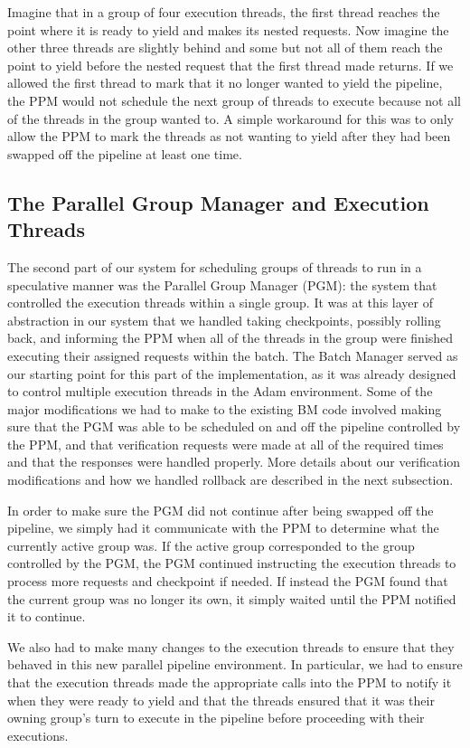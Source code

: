 \documentclass[11pt, oneside]{report}
\begin{document}
Imagine that in a group of four execution threads, the first thread reaches the point where it is ready to yield and makes its nested requests. 
Now imagine the other three threads are slightly behind and some but not all of them reach the point to yield before the nested request that the first thread made returns. 
If we allowed the first thread to mark that it no longer wanted to yield the pipeline, the PPM would not schedule the next group of threads to execute because not all of the threads in the group wanted to. 
A simple workaround for this was to only allow the PPM to mark the threads as not wanting to yield after they had been swapped off the pipeline at least one time.

\subsection{The Parallel Group Manager and Execution Threads}

The second part of our system for scheduling groups of threads to run in a speculative manner was the Parallel Group Manager (PGM): the system that controlled the execution threads within a single group. 
It was at this layer of abstraction in our system that we handled taking checkpoints, possibly rolling back, and informing the PPM when all of the threads in the group were finished executing their assigned requests within the batch. 
The Batch Manager served as our starting point for this part of the implementation, as it was already designed to control multiple execution threads in the Adam environment. 
Some of the major modifications we had to make to the existing BM code involved making sure that the PGM was able to be scheduled on and off the pipeline controlled by the PPM, and that verification requests were made at all of the required times and that the responses were handled properly. 
More details about our verification modifications and how we handled rollback are described in the next subsection. 


In order to make sure the PGM did not continue after being swapped off the pipeline, we simply had it communicate with the PPM to determine what the currently active group was. 
If the active group corresponded to the group controlled by the PGM, the PGM continued instructing the execution threads to process more requests and checkpoint if needed. 
If instead the PGM found that the current group was no longer its own, it simply waited until the PPM notified it to continue.

We also had to make many changes to the execution threads to ensure that they behaved in this new parallel pipeline environment. 
In particular, we had to ensure that the execution threads made the appropriate calls into the PPM to notify it when they were ready to yield and that the threads ensured that it was their owning group's turn to execute in the pipeline before proceeding with their executions.
\end{document}

